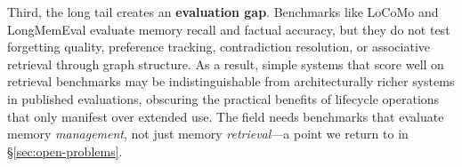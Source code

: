 Third, the long tail creates an \textbf{evaluation gap}. Benchmarks like
LoCoMo and LongMemEval evaluate memory recall and factual accuracy, but they
do not test forgetting quality, preference tracking, contradiction resolution,
or associative retrieval through graph structure. As a result, simple systems
that score well on retrieval benchmarks may be indistinguishable from
architecturally richer systems in published evaluations, obscuring the
practical benefits of lifecycle operations that only manifest over extended
use. The field needs benchmarks that evaluate memory \emph{management}, not
just memory \emph{retrieval}---a point we return to in
\S\ref{sec:open-problems}.



